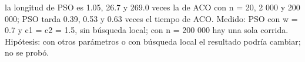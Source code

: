 {la longitud de PSO es 1.05, 26.7 y 269.0 veces la de ACO con n = 20, 2 000 y 200 000; PSO tarda 0.39, 0.53 y 0.63 veces el tiempo de ACO.}
{Medido: PSO con w = 0.7 y c1 = c2 = 1.5, sin búsqueda local; con n = 200 000 hay una sola corrida. Hipótesis: con otros parámetros o con búsqueda local el resultado podría cambiar; no se probó.}
